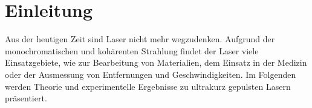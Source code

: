 \section{Einleitung}

Aus der heutigen Zeit sind Laser nicht mehr wegzudenken.
Aufgrund der monochromatischen und kohärenten Strahlung findet der Laser
viele Einsatzgebiete, wie zur Bearbeitung von Materialien, dem Einsatz in der Medizin oder
der Ausmessung von Entfernungen und Geschwindigkeiten.
Im Folgenden werden Theorie und experimentelle Ergebnisse zu
ultrakurz gepulsten Lasern präsentiert.

